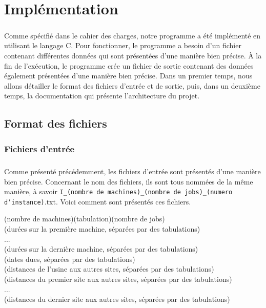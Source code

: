 \chapter{Implémentation}


	\paragraph{}
	Comme spécifié dans le cahier des charges, notre programme a été implémenté en utilisant le langage C. Pour fonctionner, le programme a besoin d'un fichier contenant différentes données qui sont présentées d'une manière bien précise. À la fin de l'exécution, le programme crée un fichier de sortie contenant des données également présentées d'une manière bien précise. Dans un premier temps, nous allons détailler le format des fichiers d'entrée et de sortie, puis, dans un deuxième temps, la documentation qui présente l'architecture du projet.
%

	\section{Format des fichiers}
		\subsection{Fichiers d'entrée}
	
	\paragraph{}
	Comme présenté précédemment, les fichiers d'entrée sont présentés d'une manière bien précise. Concernant le nom des fichiers, ils sont tous nommées de la même manière, à savoir \texttt{I\_(nombre de machines)\_(nombre de jobs)\_(numero d'instance)}.txt. Voici comment sont présentés ces fichiers. 
	\begin{flushleft}
	(nombre de machines)(tabulation)(nombre de jobs) \\
	(durées sur la première machine, séparées par des tabulations) \\
	... \\
	(durées sur la dernière machine, séparées par des tabulations) \\
	(dates dues, séparées par des tabulations) \\
	(distances de l'usine aux autres sites, séparées par des tabulations) \\
	(distances du premier site aux autres sites, séparées par des tabulations) \\
	... \\
	(distances du dernier site aux autres sites, séparées par des tabulations)
	\end{flushleft}
%

